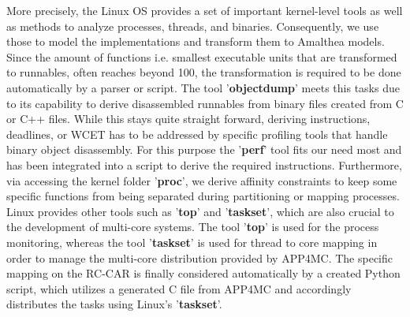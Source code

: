 \documentclass [a4paper,final,conference,10pt]{IDAACS}
\begin{document}
More precisely, the Linux OS provides a set of important kernel-level tools as well as methods to analyze processes, threads, and binaries. Consequently, we use those to model the implementations and transform them to Amalthea models. Since the amount of functions i.e. smallest executable units that are transformed to runnables, often reaches beyond 100, the transformation is required to be done automatically by a parser or script. The tool '\textbf{objectdump}' meets this tasks due to its capability to derive disassembled runnables from binary files created from C or C++ files. While this stays quite straight forward, deriving instructions, deadlines, or WCET has to be addressed by specific profiling tools that handle binary object disassembly. For this purpose the '\textbf{perf}' tool fits our need most and has been integrated into a script to derive the required instructions. Furthermore, via accessing the kernel folder '\textbf{proc}', we derive affinity constraints to keep some specific functions from being separated during partitioning or mapping processes. 
Linux provides other tools such as '\textbf{top}' and '\textbf{taskset}', which are also crucial to the development of multi-core systems. The tool '\textbf{top}' is used for the process monitoring, whereas the tool '\textbf{taskset}' is used for thread to core mapping in order to manage the multi-core distribution provided by APP4MC.
The specific mapping on the RC-CAR is finally considered automatically by a created Python script, which utilizes a generated C file from APP4MC and accordingly distributes the tasks using Linux's '\textbf{taskset}'.
\end{document}
